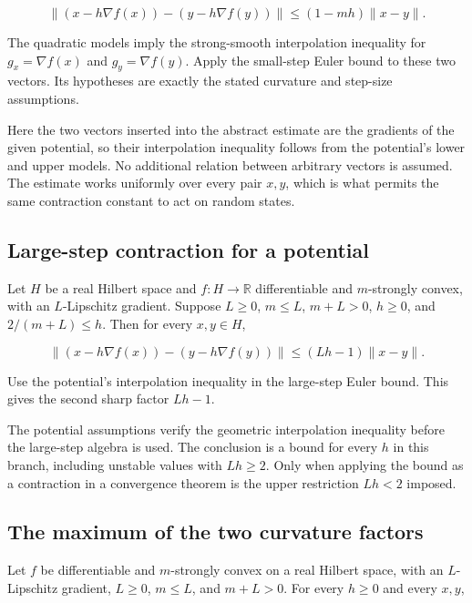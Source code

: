 \documentclass[11pt,a4paper]{article}
\begin{document}
\[\|(x-h\nabla f(x))-(y-h\nabla f(y))\|\le(1-mh)\|x-y\|.\]

The quadratic models imply the strong-smooth interpolation inequality for \(g_x=\nabla f(x)\) and \(g_y=\nabla f(y)\). Apply the small-step Euler bound to these two vectors. Its hypotheses are exactly the stated curvature and step-size assumptions.



Here the two vectors inserted into the abstract estimate are the gradients of the given potential, so their interpolation inequality follows from the potential's lower and upper models. No additional relation between arbitrary vectors is assumed. The estimate works uniformly over every pair \(x,y\), which is what permits the same contraction constant to act on random states.


\subsection{\texorpdfstring{Large-step contraction for a potential}{Large-step contraction for a potential}}


Let \(H\) be a real Hilbert space and \(f:H\to\mathbb R\) differentiable and \(m\)-strongly convex, with an \(L\)-Lipschitz gradient. Suppose \(L\ge0\), \(m\le L\), \(m+L>0\), \(h\ge0\), and \(2/(m+L)\le h\). Then for every \(x,y\in H\),

\[\|(x-h\nabla f(x))-(y-h\nabla f(y))\|\le(Lh-1)\|x-y\|.\]

Use the potential's interpolation inequality in the large-step Euler bound. This gives the second sharp factor \(Lh-1\).



The potential assumptions verify the geometric interpolation inequality before the large-step algebra is used. The conclusion is a bound for every \(h\) in this branch, including unstable values with \(Lh\ge2\). Only when applying the bound as a contraction in a convergence theorem is the upper restriction \(Lh<2\) imposed.


\subsection{\texorpdfstring{The maximum of the two curvature factors}{The maximum of the two curvature factors}}


Let \(f\) be differentiable and \(m\)-strongly convex on a real Hilbert space, with an \(L\)-Lipschitz gradient, \(L\ge0\), \(m\le L\), and \(m+L>0\). For every \(h\ge0\) and every \(x,y\),
\end{document}

